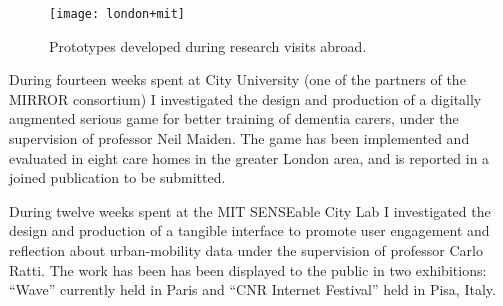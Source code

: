 \begin{figure}[tbh] 
	\centering 
	\texttt{[image: london+mit]} 
	\caption{Prototypes developed during research visits abroad.} 
	\label{fig:research-abroad} 
\end{figure}

During fourteen weeks spent at City University (one of the partners of the MIRROR consortium) I investigated the design and production of a digitally augmented serious game for better training of dementia carers, under the supervision of professor Neil Maiden. The game has been implemented and evaluated in eight care homes in the greater London area, and is reported in a joined publication to be submitted.

During twelve weeks spent at the MIT SENSEable City Lab I investigated the design and production of a tangible interface to promote user engagement and reflection about urban-mobility data under the supervision of professor Carlo Ratti. The work has been has been displayed to the public in two exhibitions: ``Wave'' currently held in Paris and ``CNR Internet Festival'' held in Pisa, Italy. 
